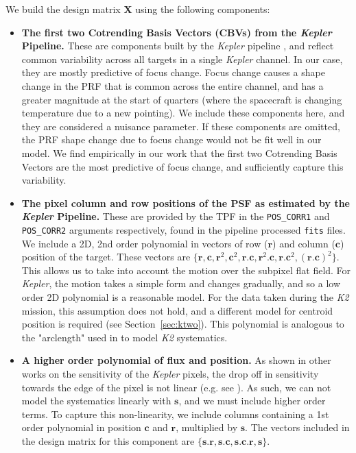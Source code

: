 \documentclass[iop]{emulateapj}
\newcommand{\kepler}{\emph{Kepler}\xspace}
\newcommand{\ktwo}{\emph{K2}\xspace}
\begin{document}
We build the design matrix $\mathbf{X}$ using the following components:
\begin{itemize}
    \item \textbf{The first two Cotrending Basis Vectors (CBVs) from the \kepler Pipeline.} These are components built by the \kepler pipeline \citep{pipeline}, and reflect common variability across all targets in a single \kepler channel. In our case, they are mostly predictive of focus change. Focus change causes a shape change in the PRF that is common across the entire channel, and has a greater magnitude at the start of quarters (where the spacecraft is changing temperature due to a new pointing). We include these components here, and they are considered a nuisance parameter. If these components are omitted, the PRF shape change due to focus change would not be fit well in our model. We find empirically in our work that the first two Cotrending Basis Vectors are the most predictive of focus change, and sufficiently capture this variability.
    \item \textbf{The pixel column and row positions of the PSF as estimated by the \kepler Pipeline.} These are provided by the TPF in the \texttt{POS\_CORR1} and \texttt{POS\_CORR2} arguments respectively, found in the pipeline processed \texttt{fits} files. We include a 2D, 2nd order polynomial in vectors of row ($\mathbf{r}$) and column ($\mathbf{c}$) position of the target. These vectors are $\{\mathbf{r}, \mathbf{c}, \mathbf{r}^2, \mathbf{c}^2, \mathbf{r}.\mathbf{c},\mathbf{r}^2.\mathbf{c}, \mathbf{r}.\mathbf{c}^2, (\mathbf{r}.\mathbf{c})^2 \}$. This allows us to take into account the motion over the subpixel flat field. For \kepler, the motion takes a simple form and changes gradually, and so a low order 2D polynomial is a reasonable model. For the data taken during the \ktwo mission, this assumption does not hold, and a different model for centroid position is required (see Section~\ref{sec:ktwo}). This polynomial is analogous to the "arclength" used in \cite{Vanderburg2014} to model \ktwo systematics.
    \item \textbf{A higher order polynomial of flux and position.} As shown in other works on the sensitivity of the \kepler pixels, the drop off in sensitivity towards the edge of the pixel is not linear (e.g. see \cite{vorobiev}). As such, we can not model the systematics linearly with $\mathbf{s}$, and we must include higher order terms. To capture this non-linearity, we include columns containing a 1st order polynomial in position $\mathbf{c}$ and $\mathbf{r}$, multiplied by $\mathbf{s}$. The vectors included in the design matrix for this component are $\{\mathbf{s}.\mathbf{r}, \mathbf{s}.\mathbf{c}, \mathbf{s}.\mathbf{c}.\mathbf{r}, \mathbf{s}\}$.

\end{itemize}
\end{document}
